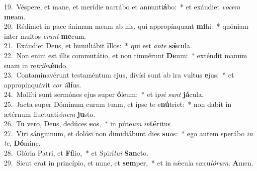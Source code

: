 {19.~}Véspere, et mane, et merídie narrábo et annunti\textbf{á}bo:~* et exáudiet \textit{vo}\textit{cem} \textbf{me}am.\\
{20.~}Rédimet in pace ánimam meam ab his, qui appropínquant \textbf{mi}hi:~* quóniam inter multos \textit{e}\textit{rant} \textbf{me}cum.\\
{21.~}Exáudiet Deus, et humiliábit \textbf{il}los:~* qui est \textit{an}\textit{te} \textbf{sǽ}cula.\\
{22.~}Non enim est illis commutátio, et non timuérunt \textbf{De}um:~* exténdit manum suam in re\textit{tri}\textit{bu}\textbf{én}do.\\
{23.~}Contaminavérunt testaméntum ejus, divísi sunt ab ira vultus \textbf{e}jus:~* et appropinquávit \textit{cor} \textit{il}\textbf{lí}us.\\
{24.~}Mollíti sunt sermónes ejus super \textbf{ó}leum:~* et i\textit{psi} \textit{sunt} \textbf{já}cula.\\
{25.~}Jacta super Dóminum curam tuam, et ipse te e\textbf{nú}triet:~* non dabit in ætérnum fluctuati\textit{ó}\textit{nem} \textbf{ju}sto.\\
{26.~}Tu vero, Deus, dedúces \textbf{e}os,~* in púte\textit{um} \textit{in}\textbf{té}ritus\\
{27.~}Viri sánguinum, et dolósi non dimidiábunt dies \textbf{su}os:~* ego autem sperábo \textit{in} \textit{te}, \textbf{Dó}mine.\\
{28.~}Glória Patri, et \textbf{Fí}lio,~* et Spirí\textit{tu}\textit{i} \textbf{San}cto.\\
{29.~}Sicut erat in princípio, et nunc, et \textbf{sem}per,~* et in sǽcula sæcu\textit{ló}\textit{rum}. \textbf{A}men.\\
